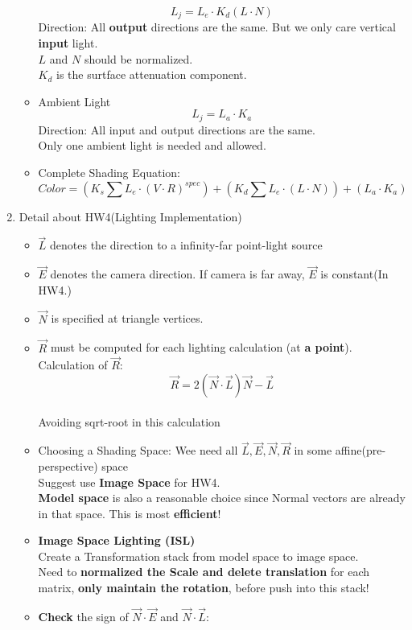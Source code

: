 \documentclass[geye,cyan,normal,en]{elegantnote}
\begin{document}
\begin{enumerate}
\begin{itemize}
		$$L_j = L_e \cdot K_d (L\cdot N)$$
		Direction: All \textbf{output} directions are the same. But we only care vertical \textbf{input} light.\\
		$L$ and $N$ should be normalized.\\
		$K_d$ is the surtface attenuation component.
		\item Ambient Light\\
		$$L_j = L_a \cdot K_a$$
		Direction: All input and output directions are the same.\\
		Only one ambient light is needed and allowed.
		\item Complete Shading Equation:
		$$Color=(K_s\sum{ L_e \cdot (V\cdot R)^{spec}}) + (K_d\sum{ L_e \cdot (L\cdot N)}) + (L_a \cdot K_a)$$	
	\end{itemize}
	\item Detail about HW4(Lighting Implementation)
	\begin{itemize}
		\item $\vec{L}$ denotes the direction to a infinity-far point-light source
		\item $\vec{E}$ denotes the camera direction. If camera is far away, $\vec{E}$ is constant(In HW4.)
		\item $\vec{N}$ is specified at triangle vertices.
		\item $\vec{R}$ must be computed for each lighting calculation (at \textbf{a point}).\\
		Calculation of $\vec{R}$:\\
		$$\vec{R}=2(\vec{N}\cdot \vec{L})\vec{N}-\vec{L}$$\\
		Avoiding sqrt-root in this calculation
		\item Choosing a Shading Space: Wee need all $\vec{L},\vec{E},\vec{N},\vec{R}$ in some affine(pre-perspective) space \\
		Suggest use \textbf{Image Space} for HW4. \\
		\textbf{Model space} is also a reasonable choice since Normal vectors are already in that space. This is most \textbf{efficient}!
		\item \textbf{Image Space Lighting (ISL)}\\
		Create a Transformation stack from model space to image space.\\
		Need to \textbf{normalized the Scale and delete translation} for each matrix, \textbf{only maintain the rotation}, before push into this stack!
		\item \textbf{Check} the sign of \textbf{$\vec{N}\cdot\vec{E}$} and \textbf{$\vec{N}\cdot\vec{L}$}:\\

\end{itemize}
\end{enumerate}
\end{document}
